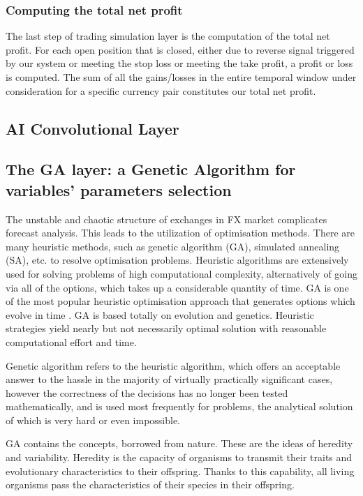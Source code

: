\subsubsection{Computing the total net profit}
The last step of trading simulation layer is the computation of the total net profit.  
For each open position that is closed, either due to reverse signal triggered by our system or meeting the stop loss or meeting the take profit, a profit or loss is computed. The sum of all the gains/losses in the entire temporal window under consideration for a specific currency pair constitutes our total net profit.


\subsection{AI Convolutional Layer}
\label{subsection:ai}


\subsection{The GA layer: a Genetic Algorithm for variables' parameters selection}
\label{subsection:ga}
The unstable and chaotic structure of exchanges in FX market complicates forecast analysis. This leads to the utilization of optimisation methods. There are many heuristic methods, such as genetic algorithm (GA), simulated annealing (SA), etc. to resolve optimisation problems. Heuristic algorithms are extensively used for solving problems of high computational complexity, alternatively of going via all of the options, which takes up a considerable quantity of time. GA is one of the most popular heuristic optimisation approach that generates options which evolve in time \cite{OZTURK2016170}. GA is based totally on evolution and genetics. Heuristic strategies yield nearly but not necessarily optimal solution with reasonable computational effort and time.

Genetic algorithm refers to the heuristic algorithm, which offers an acceptable answer to the hassle in the majority of virtually practically significant cases, however the correctness of the decisions has no longer been tested mathematically, and is used most frequently for problems, the analytical solution of which is very hard or even impossible.

GA contains the concepts, borrowed from nature. These are the ideas of heredity and variability. Heredity is the capacity of organisms to transmit their traits and evolutionary characteristics to their offspring. Thanks to this capability, all living organisms pass the characteristics of their species in their offspring.

